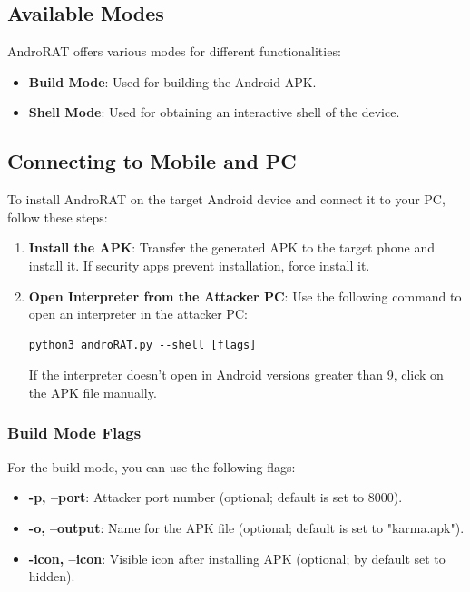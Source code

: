\documentclass[12pt]{article}
\begin{document}
\subsection{Available Modes}
AndroRAT offers various modes for different functionalities:

\begin{itemize}
    \item \textbf{Build Mode}: Used for building the Android APK.
    \item \textbf{Shell Mode}: Used for obtaining an interactive shell of the device.
\end{itemize}

\subsection{Connecting to Mobile and PC}
To install AndroRAT on the target Android device and connect it to your PC, follow these steps:

\begin{enumerate}
    \item \textbf{Install the APK}: Transfer the generated APK to the target phone and install it. If security apps prevent installation, force install it.
    
    \item \textbf{Open Interpreter from the Attacker PC}: Use the following command to open an interpreter in the attacker PC:
    \begin{lstlisting}[style=shell]
    python3 androRAT.py --shell [flags]
    \end{lstlisting}
    If the interpreter doesn't open in Android versions greater than 9, click on the APK file manually.
\end{enumerate}

\subsubsection{Build Mode Flags}
For the build mode, you can use the following flags:

\begin{itemize}
    \item \textbf{-p, --port}: Attacker port number (optional; default is set to 8000).
    \item \textbf{-o, --output}: Name for the APK file (optional; default is set to "karma.apk").
    \item \textbf{-icon, --icon}: Visible icon after installing APK (optional; by default set to hidden).
\end{itemize}
\end{document}
